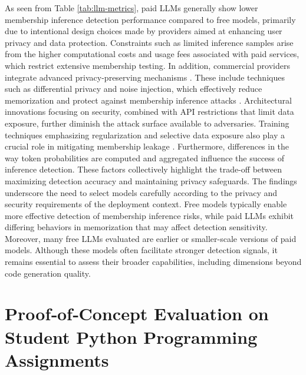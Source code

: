 \documentclass[runningheads]{llncs}
\begin{document}
As seen from Table \ref{tab:llm-metrics}, paid LLMs generally show lower membership inference detection performance compared to free models, primarily due to intentional design choices made by providers aimed at enhancing user privacy and data protection. Constraints such as limited inference samples arise from the higher computational costs and usage fees associated with paid services, which restrict extensive membership testing. In addition, commercial providers integrate advanced privacy-preserving mechanisms \cite{r35}. These include techniques such as differential privacy and noise injection, which effectively reduce memorization and protect against membership inference attacks \cite{r35}. Architectural innovations focusing on security, combined with API restrictions that limit data exposure, further diminish the attack surface available to adversaries. Training techniques emphasizing regularization and selective data exposure also play a crucial role in mitigating membership leakage \cite{r35}. Furthermore, differences in the way token probabilities are computed and aggregated influence the success of inference detection. These factors collectively highlight the trade-off between maximizing detection accuracy and maintaining privacy safeguards. The findings underscore the need to select models carefully according to the privacy and security requirements of the deployment context. Free models typically enable more effective detection of membership inference risks, while paid LLMs exhibit differing behaviors in memorization that may affect detection sensitivity. Moreover, many free LLMs evaluated are earlier or smaller-scale versions of paid models. Although these models often facilitate stronger detection signals, it remains essential to assess their broader capabilities, including dimensions beyond code generation quality. 


\section{Proof‑of‑Concept Evaluation on Student Python Programming Assignments}\label{casestudy}
\end{document}
